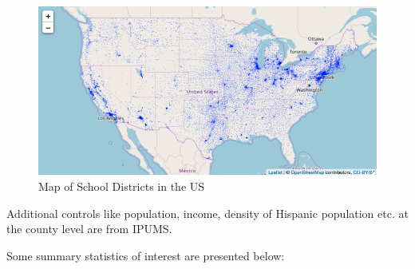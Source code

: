 \documentclass{article}
\begin{document}
\begin{figure}[!hbtp]
\centering
\caption{Map of School Districts in the US}
\includegraphics[width=12cm]{../analysis/Output/img/LEAMap.png}
\end{figure} 

Additional controls like population, income, density of Hispanic population etc. at the county level are from IPUMS.

Some summary statistics of interest are presented below:

\clearpage


\clearpage

\subsection*{}



%

%
\end{document}

